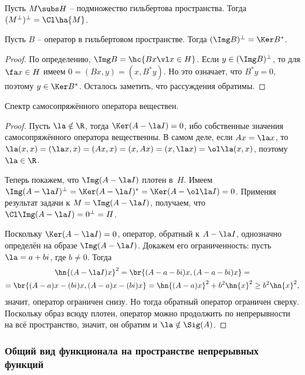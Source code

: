 \documentclass[a4paper]{article}
\begin{document}
\begin{problem}
Пусть $M \subs H$ -- подмножество гильбертова пространства. Тогда $(M^\bot)^\bot = \Cl\ha{M}$.
\end{problem}

\begin{stm}
Пусть $B$ -- оператор в гильбертовом пространстве. Тогда $(\Img B)^\bot = \Ker B^*$.
\end{stm}
\begin{proof}
По определению, $\Img B = \hc{Bx \vl x \in H}$. Если $y \in (\Img B)^\bot$, то
для $\fa x \in H$ имеем $0 = (Bx,y) = (x, B^*y)$. Но это означает, что $B^*y = 0$,
поэтому $y\in \Ker B^*$. Осталось заметить, что рассуждения обратимы.
\end{proof}

\begin{stm}
Спектр самосопряжённого оператора веществен.
\end{stm}
\begin{proof}
Пусть $\la \notin\R$, тогда $\Ker(A-\la I) = 0$, ибо собственные значения
самосопряжённого оператора вещественны. В самом деле, если $Ax = \la x$,
то $\la(x,x) = (\la x, x)=(Ax,x) = (x,Ax) = (x,\la x) = \ol\la(x,x)$, поэтому
$\la \in \R$.

Теперь покажем, что $\Img (A-\la I)$ плотен в~$H$.
Имеем $\Img(A - \la I)^\bot = \Ker(A - \la I)^* = \Ker(A - \ol \la I) = 0$.
Применяя результат задачи к $M = \Img(A - \la I)$, получаем, что $\Cl \Img(A - \la I) = 0^\bot = H$.

Поскольку $\Ker (A-\la I) = 0$, оператор, обратный к $A - \la I$, однозначно определён на образе $\Img (A-\la I)$.
Докажем его ограниченность: пусть $\la = a + bi$, где $b \neq 0$. Тогда
\begin{multline*}
\hn{(A - \la I)x}^2 = \br{ (A - a - bi)x, (A - a - bi)x} =\\=
\br{ (A-a)x - (b i)x, (A - a)x - (b i)x} = \hn{(A-a)x}^2 + b^2\hn{x}^2 \ge b^2 \hn{x}^2,
\end{multline*}
значит, оператор ограничен снизу. Но тогда обратный оператор ограничен сверху.
Поскольку образ всюду плотен, оператор можно продолжить по непрерывности на всё пространство,
значит, он обратим и $\la \notin \Sig(A)$.
\end{proof}


\subsubsection{Общий вид функционала на пространстве непрерывных функций}
\end{document}
